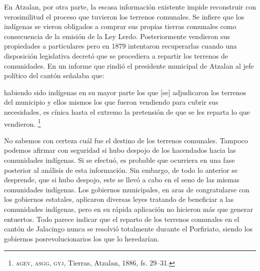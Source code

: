 \documentclass[14pt,twoside,final]{extbook} %
\let\oldfootnote\footnote
\renewcommand\footnote[1]{%
\oldfootnote{\hspace{1mm}#1}}
\providecommand\phantomsection{} %
\begin{document}
En Atzalan, por otra parte, la escasa información existente impide reconstruir con verosimilitud el proceso que tuvieron los terrenos comunales. Se infiere que los indígenas se vieron obligados a comprar sus propias tierras comunales como consecuencia de la emisión de la Ley Lerdo. Posteriormente vendieron sus propiedades a particulares pero en 1879 intentaron recuperarlas cuando una disposición legislativa decretó que se procediera a repartir los terrenos de comunidades. En un informe que rindió el presidente municipal de Atzalan al jefe político del cantón señalaba que:
\begin{quoting}
habiendo sido indígenas en su mayor parte los que [se] adjudicaron los terrenos del municipio y ellos mismos los que fueron vendiendo para cubrir sus necesidades, es cínica hasta el extremo la pretensión de que se les reparta lo que vendieron.\footnote{\textsc{agev, asgg, gyj}, Tierras, Atzalan, 1886, fs. 29--31.}
\end{quoting}
No sabemos con certeza cuál fue el destino de los terrenos comunales. Tampoco podemos afirmar con seguridad si hubo despojo de los hacendados hacia las comunidades indígenas. Si se efectuó, es probable que ocurriera en una fase posterior al análisis de esta información. Sin embargo, de todo lo anterior se desprende, que si hubo despojo, este se llevó a cabo en el seno de las mismas comunidades indígenas. Los gobiernos municipales, en aras de congratularse con los gobiernos estatales, aplicaron
diversas leyes tratando de beneficiar a las comunidades indígenas, pero en su rápida aplicación no hicieron más que generar entuertos. Todo parece indicar que el reparto de los terrenos comunales en el cantón de Jalacingo nunca se resolvió totalmente durante el Porfiriato, siendo los gobiernos posrevolucionarios los que lo heredarían.\protect\phantomsection\label{para:errata}
\end{document}
